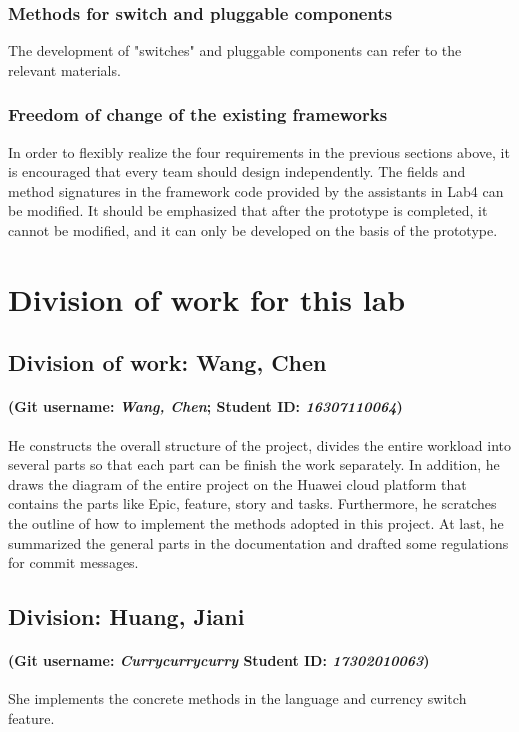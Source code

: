 \documentclass[a4paper]{report}
\begin{document}
\subsection{Methods for switch and pluggable components}
The development of "switches" and pluggable components can refer to the relevant materials.
\subsection{Freedom of change of the existing frameworks}
In order to flexibly realize the four requirements in the previous sections above, it is encouraged that every team should design independently. The fields and method signatures in the framework code provided by the assistants in Lab4 can be modified. It should be emphasized that after the prototype is completed, it cannot be modified, and it can only be developed on the basis of the prototype.
\chapter{Division of work for this lab}
\section{Division of work: Wang, Chen}
\subsubsection{(Git username: \emph{Wang, Chen}; Student ID: \emph{16307110064})}
He constructs the overall structure of the project, divides the entire workload into several parts so that each part can be finish the work separately. In addition, he draws the diagram of the entire project on the Huawei cloud platform that contains the parts like Epic, feature, story and tasks. Furthermore, he scratches the outline of how to implement the methods adopted in this project. At last, he summarized the general parts in the documentation and drafted some regulations for commit messages.

\section{Division: Huang, Jiani}
\subsubsection{(Git username: \emph{Currycurrycurry} Student ID: \emph{17302010063})}
She implements the concrete methods in the language and currency switch feature.
\end{document}
